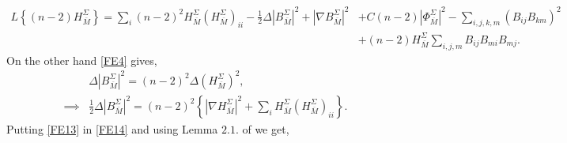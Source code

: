 \documentclass[11pt]{amsart}
\numberwithin{equation}{section}
\begin{document}
\begin{align}\label{FE14}
    L\left\{(n-2)H^{\Sigma}_{\overline{M}}\right\}=\sum_i (n-2)^2 H^{\Sigma}_{\overline{M}} \left(H^{\Sigma}_{\overline{M}}\right)_{ii}-\frac{1}{2} \Delta \left|B^{\Sigma}_{\overline{M}}\right|^2+ \left|\nabla B^{\Sigma}_{\overline{M}}\right|^2&+C(n-2)\left|\Phi^{\Sigma}_{\overline{M}}\right|^2-\sum_{i, j, k, m} (B_{ij} B_{km})^2 \nonumber\\
    &+(n-2)H^{\Sigma}_{\overline{M}} \sum_{i, j, m} B_{ij} B_{mi} B_{mj}.
\end{align}
On the other hand \eqref{FE4} gives,
\begin{align}\label{FE13}
    &\Delta \left|B^{\Sigma}_{\overline{M}}\right|^2= (n-2)^2\Delta \left(H^{\Sigma}_{\overline{M}}\right)^2, \nonumber\\
\implies &\frac{1}{2} \Delta \left|B^{\Sigma}_{\overline{M}}\right|^2= (n-2)^2\left\{|\nabla H^{\Sigma}_{\overline{M}}|^2+\sum_i H^{\Sigma}_{\overline{M}} \left(H^{\Sigma}_{\overline{M}}\right)_{ii}\right\}.
\end{align}
Putting \eqref{FE13} in \eqref{FE14} and using Lemma $2.1.$ of \cite{GL} we get,
\end{document}
